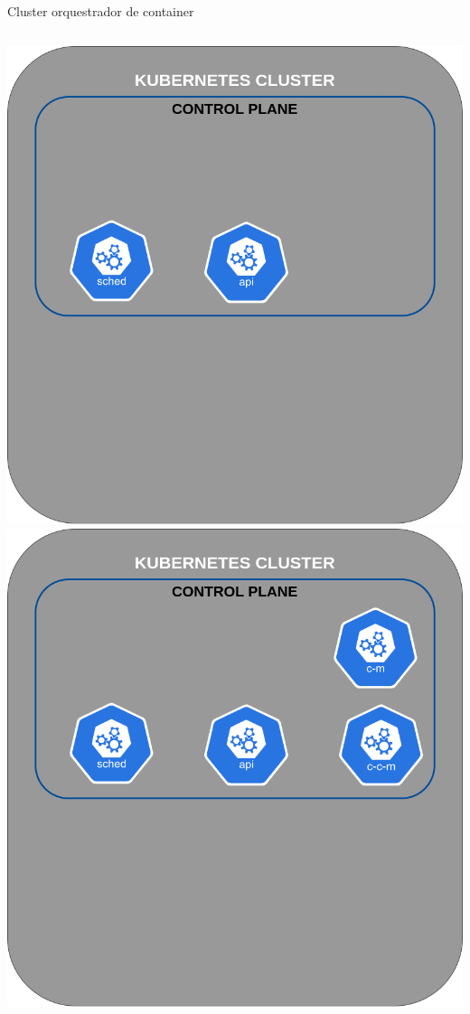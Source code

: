 \documentclass[10pt,brazil]{beamer}
\theoremstyle{definition}
\begin{document}
\begin{frame}{Cluster orquestrador de container}
\begin{columns}
\begin{column}{0.5\textwidth}
\begin{center}
\begin{overprint}
          \includegraphics[width=1\textwidth]{k8s-4.png}
          \includegraphics[width=1\textwidth]{k8s-5.png}

\end{overprint}
\end{center}
\end{column}
\end{columns}
\end{frame}
\end{document}
